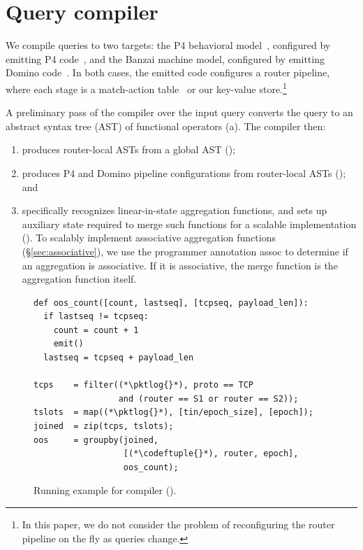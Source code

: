 \section{Query compiler}
\label{sec:compiler}

We compile \TheSystem queries to two targets: the P4 behavioral
model~\cite{p4-bmv2}, configured by emitting P4 code~\cite{p4_16}, and the
Banzai machine model, configured by emitting Domino code~\cite{domino_sigcomm}.
In both cases, the emitted code configures a router pipeline, where each stage
is a match-action table~\cite{rmt} or our key-value
store.\footnote{In this paper, we do not consider the problem of reconfiguring
the router pipeline on the fly as queries change.}

A preliminary pass of the compiler over the input query converts the query to an
abstract syntax tree (AST) of functional operators (a). The compiler then:
\begin{enumerate}
\item produces router-local ASTs from a global AST
  ();
\item produces P4 and Domino pipeline configurations from router-local ASTs
  (); and
\item specifically recognizes linear-in-state aggregation functions, and sets up
  auxiliary state required to merge such functions for a scalable implementation
  (). To scalably implement associative
  aggregation functions (\S\ref{sec:associative}), we use the programmer
  annotation {\ct assoc} to determine if an aggregation is associative. If it is
  associative, the merge function is the aggregation function itself.
\end{enumerate}

\begin{figure}[!t]{
\figcodesize
\begin{lstlisting}
def oos_count([count, lastseq], [tcpseq, payload_len]):
  if lastseq != tcpseq:
    count = count + 1
    emit()
  lastseq = tcpseq + payload_len

tcps    = filter((*\pktlog{}*), proto == TCP
                 and (router == S1 or router == S2));
tslots  = map((*\pktlog{}*), [tin/epoch_size], [epoch]);
joined  = zip(tcps, tslots);
oos     = groupby(joined,
                  [(*\codeftuple{}*), router, epoch],
                  oos_count);
\end{lstlisting}
}
\caption{Running example for \TheSystem compiler ().}
\label{fig:running-example-code}
\end{figure}

